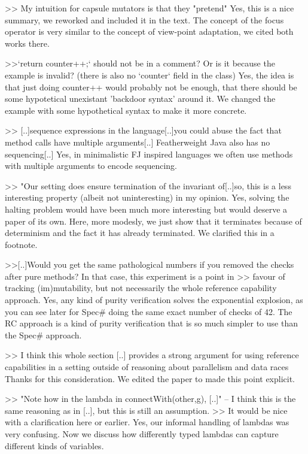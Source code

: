 >> My intuition for capsule mutators is that they "pretend"
Yes, this is a nice summary, we reworked and included it in the text. 
The concept of the focus operator is very similar to the concept of view-point adaptation, we cited both works there.


>>`return counter++;` should not be in a comment? Or is it because the example is invalid? (there is also no `counter` field in the class)
Yes, the idea is that just doing counter++ would probably not be enough, that there should be some hypotetical unexistant 'backdoor syntax' around it.
We changed the example with some hypothetical syntax to make it more concrete.

>> [..]sequence expressions in the language[..]you could abuse the fact that method calls have multiple arguments[..]  Featherweight Java also has no sequencing[..]
Yes, in minimalistic FJ inspired languages we often use methods with multiple arguments to encode sequencing.


>> "Our setting does ensure termination of the invariant of[..]so, this is a less  interesting property (albeit not uninteresting) in my opinion.
Yes, solving the halting problem would have been much more interesting but would deserve a paper of its own.
Here, more modesly, we just show that it terminates because of determinism and the fact it has already terminated.
We clarified this in a footnote.


>>[..]Would you get the same pathological numbers if you removed the checks after pure methods? In that case, this experiment is a point in
>> favour of tracking (im)mutability, but not necessarily the whole reference capability approach.
Yes, any kind of purity verification solves the exponential explosion, as you can see later for Spec# doing the same exact number of checks of 42.
The RC approach is a kind of purity verification that is so much simpler to use than the Spec# approach.

>> I think this whole section [..] provides a strong argument for using reference capabilities in a setting outside of reasoning about parallelism and data races
Thanks for this consideration. We edited the paper to made this point explicit.


>> "Note how in the lambda in connectWith(other,g), [..]" -- I think this is the same reasoning as in [..], but this is still an assumption.
>> It would be nice with a clarification here or earlier.
Yes, our informal handling of lambdas was very confusing. Now we discuss how differently typed lambdas can capture different kinds of variables.


